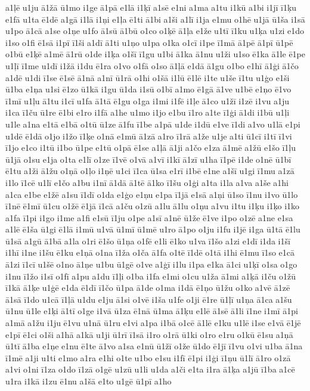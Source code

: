 {a1ļē
u1ju
ā1žā
ū1mo
i1ge
ā1pā
e1lā
i1ķī
a1sē
e1ni
a1ma
a1tu
i1kū
a1bi
i1jī
ī1ķu
e1fā
u1ta
ē1dē
a1gā
i1lā
i1ņi
e1ļa
ē1ti
ā1bi
a1ši
a1lī
i1ja
e1mu
o1hē
u1jā
ū1ša
i1sā
u1po
ā1cā
a1se
o1ņe
u1fo
ā1sū
ā1bū
o1co
o1ķē
ā1ļa
e1že
u1tī
ī1ku
u1ķa
u1zi
e1do
i1so
o1fi
ē1sā
i1pī
ī1ši
a1dī
ā1ti
u1ņo
u1pa
o1ka
o1cī
i1pe
ī1mā
ā1pē
ā1pī
ū1pē
o1bū
e1ķē
a1mē
ā1rū
o1de
i1ķa
o1šī
ī1gu
u1bi
ā1ka
ā1nu
u1ži
u1so
ē1ka
ā1le
ē1pe
u1ļī
ī1me
u1dī
i1žā
i1du
ē1ra
o1vo
o1fā
o1so
ā1ļā
e1dā
ā1gu
o1bo
e1hī
ā1ģi
ā1čo
a1dē
u1di
ī1se
ē1sē
ā1nā
a1nī
ū1rā
o1hi
o1šā
i1lū
ē1lē
i1te
u1še
ī1tu
u1ģo
e1ši
ū1ba
e1ņa
u1si
ē1zo
ū1kā
i1gu
ū1da
i1sū
o1bī
a1mo
ē1gā
ā1ve
u1bē
e1ņo
ē1vo
ī1mī
u1ļu
ā1tu
i1cī
u1fa
ā1tā
ē1gu
o1ga
i1mi
i1fē
i1ļe
ā1co
u1žī
i1zē
i1vu
a1ju
i1ca
ī1ču
ū1re
ē1bi
e1ro
i1fā
a1he
u1mo
i1jo
e1bu
ī1ro
a1te
ī1ģi
ā1di
i1bū
u1ļi
u1le
a1na
e1tā
e1bā
o1tū
ū1ze
ā1fu
ī1be
a1pā
u1de
i1dū
e1ve
ī1di
a1vo
u1lā
e1pi
u1dē
ē1dā
o1jo
i1žo
ī1ķe
o1nā
e1mū
ā1zā
a1ro
ī1rā
a1že
u1je
a1ti
ū1cī
i1tī
ī1vi
ī1jo
e1co
i1tū
i1bo
ū1pe
e1tū
o1pā
ē1se
a1ļā
ā1ji
a1čo
e1za
ā1mē
a1žū
e1šo
ī1ļu
ū1jā
o1su
e1ja
o1ta
e1lī
o1ze
ī1vē
o1vā
a1vī
i1kī
ā1zī
u1ha
ī1pē
i1de
o1nē
ū1bī
ē1tu
a1ži
ā1žu
o1ņā
o1ļo
i1ņē
u1ci
ī1ca
ū1sa
e1rī
i1bē
e1ne
a1šī
u1gi
ī1mu
a1zā
i1lo
ī1cē
u1lī
e1čo
a1bu
i1nī
ā1dā
ā1tē
ā1ko
ī1šu
o1ģi
a1ta
i1la
a1va
a1še
a1hi
a1ca
e1be
e1žē
a1su
ī1dī
o1da
e1ģo
e1ņu
e1pa
ī1jā
e1sā
a1ņi
ū1so
ī1nu
i1vo
ū1lo
ī1nē
ē1mī
ū1cu
o1žē
ē1jā
ī1cā
a1ču
o1zū
a1lu
ā1lu
o1ņu
a1vu
i1tu
i1ķu
i1ķo
i1ko
a1fa
ī1pi
i1go
i1me
a1fi
e1sū
ī1ju
o1pe
a1sī
a1nē
ū1že
ē1ve
i1po
o1zē
a1ne
e1sa
a1lē
ē1ša
ū1gi
ē1lā
i1mū
u1vā
ū1mī
ū1mē
u1ro
ā1po
o1ju
i1fu
i1jē
i1ga
ū1tā
ē1lu
ū1sā
a1gū
ā1bā
a1la
o1ri
ē1šo
ū1ņa
o1fē
e1li
ē1ko
u1va
ī1šo
a1zi
e1dī
i1da
i1šī
i1hī
i1ne
i1šu
ē1ku
e1ņā
o1na
ī1ža
o1ča
ā1fa
o1tē
ī1dē
o1tā
i1hi
ē1mu
ī1so
e1cā
ā1zi
ī1cī
u1šē
o1no
ā1ņe
u1bu
ū1gē
o1ve
a1ģī
i1lu
i1pa
e1ka
ā1ci
u1ķī
o1sa
o1go
i1nu
ī1žo
i1sī
o1fī
a1pu
a1du
ī1ļi
o1ba
i1fa
e1mi
o1cu
u1ža
ā1mi
a1ķā
i1ču
o1žū
ī1kā
ā1ķe
u1ģē
e1da
ē1dī
ī1čo
ū1pa
ā1de
o1ma
i1dā
ē1ņo
ū1žu
o1ko
a1vē
ā1zē
ā1sā
ī1do
u1cā
ī1ļā
u1du
e1ju
ā1si
o1vē
i1ša
u1fe
o1ji
ē1re
ū1ļī
u1ņa
ā1ca
a1šu
ū1nu
ū1le
e1ķi
ā1tī
o1ge
i1vā
ū1za
ē1nā
ū1ma
ā1ķu
e1lē
ā1sē
ā1li
ī1ne
i1mī
ā1pi
a1mā
a1žu
i1ju
ē1vu
u1nā
ū1ru
e1vi
a1pa
i1bā
o1cē
ā1lē
e1ku
u1lē
i1se
e1vā
ē1jē
e1pī
ē1ci
o1ši
a1hā
a1kā
u1ji
ū1rī
ī1sā
i1ro
o1rā
ū1ki
o1ro
e1ru
o1kū
ē1su
a1ņā
ū1tī
ā1ba
e1ņe
e1nu
ē1te
ā1vo
a1sa
e1nū
ū1žī
o1že
ū1do
ē1jī
ī1vu
o1vi
u1ba
ā1na
ī1mē
a1ji
u1ti
e1mo
a1ra
e1hi
o1te
u1bo
e1su
i1fī
ē1pi
i1ģi
ī1ņu
ū1lī
ā1ro
o1zā
a1vi
o1ni
ī1za
o1do
ī1zā
o1gē
u1zū
u1li
u1da
a1či
e1ta
i1ra
ā1ķa
a1jū
ī1ba
a1cē
u1ra
i1kā
i1zu
ē1nu
a1šā
e1to
u1gē
ū1pī
a1ho
}
